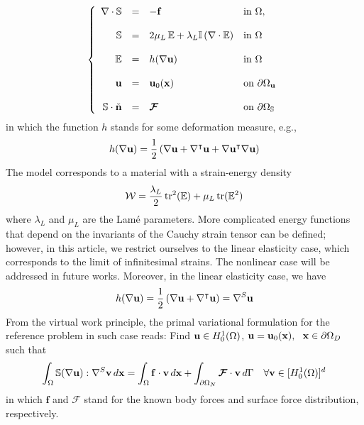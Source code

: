 $$
\left\lbrace
\begin{array}{rcll}
\nabla \cdot \mathbb{S} &=& -\mathbf{f} & \mbox{in}~\Omega,\\
\\
\mathbb{S} &=&  2\mu_L \,\mathbb{E} + \lambda_L \mathbb{I} \, (\nabla \cdot \mathbb{E}) & \mbox{in}~\Omega \\
\\
\mathbb{E} &=& h(\nabla{\mathbf{u}})  & \mbox{in}~\Omega \\
\\
\mathbf{u} &=& \mathbf{u}_0(\mathbf{x}) & \mbox{on}~\partial\Omega_{\mathbf{u}} \\
\\
\mathbb{S} \cdot \check{\mathbf{n}} &=& \boldsymbol{\mathcal{F}} & \mbox{on}~\partial\Omega_{\mathbb{S}}
\end{array}
\right.
$$
in which the function $h$ stands for some deformation measure, e.g.,
$$
h(\nabla{\mathbf{u}}) = \frac12 \left ( \nabla{\mathbf{u}} + \nabla^{\intercal}{\mathbf{u}} +  \nabla{\mathbf{u}}^{\intercal} \nabla{\mathbf{u}} \right )
$$ 
The model corresponds to a material with a strain-energy density 
$$
\mathcal{W} = \frac{\lambda_L}{2} \, \mbox{tr}^2(\mathbb{E}) + \mu_L \,  \mbox{tr}(\mathbb{E}^2)
$$
where $\lambda_L$ and $\mu_L$ are the Lam\'e parameters.
More complicated energy functions that depend on the invariants of the Cauchy strain 
tensor can be defined; however, in this article, we restrict ourselves to the linear 
elasticity case, which corresponds to the limit of infinitesimal strains. 
The nonlinear case will be addressed in future works. Moreover,
in the linear elasticity case, we have
$$
h(\nabla{\mathbf{u}}) = \frac12 \left ( \nabla{\mathbf{u}} + \nabla^{\intercal}{\mathbf{u}} \right ) = \nabla^S{\mathbf{u}}
$$
From the virtual work principle, the primal variational formulation for the reference problem in such 
case reads: Find $\mathbf{u} \in H_0^1(\Omega)$, $\mathbf{u} = \mathbf{u}_0(\mathbf{x}),~~\mathbf{x} \in \partial{\Omega}_D$
such that
$$
\int_{\Omega} {\mathbb{S}(\nabla\mathbf{u})} : \nabla^{S}{\mathbf{v}} \, d{\mathbf{x}} = \int_{\Omega} \mathbf{f} \cdot {\mathbf{v}}\, d{\mathbf{x}}  + \int_{\partial{\Omega}_N} {\boldsymbol{\mathcal{F}}\cdot \mathbf{v}}\,d\Gamma~~~\forall \mathbf{v} \in [H_0^1(\Omega)]^d
$$
in which $\mathbf{f}$ and $\boldsymbol{\mathcal{F}}$ stand for the known body forces and
surface force distribution, respectively.

